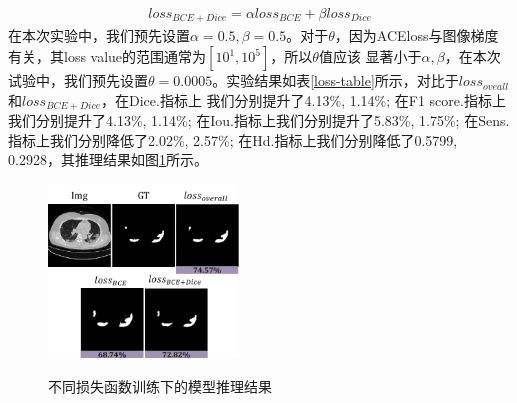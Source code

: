 \documentclass{ieeeaccess}
\begin{document}
    \begin{align}
      loss_{BCE+Dice} = \alpha loss_{BCE} + \beta loss_{Dice}
    \end{align}
    在本次实验中，我们预先设置\(\alpha=0.5, \beta=0.5\)。对于\(\theta\)，因为ACEloss与图像梯度有关，其loss value的范围通常为\([10^1, 10^5]\)，所以\(\theta\)值应该
    显著小于\(\alpha, \beta\)，在本次试验中，我们预先设置\(\theta=0.0005\)。实验结果如表\ref{loss-table}所示，对比于\(loss_{oveall}\)和\(loss_{BCE+Dice}\)，在Dice.指标上
    我们分别提升了4.13\%, 1.14\%; 在F1 score.指标上我们分别提升了4.13\%, 1.14\%; 在Iou.指标上我们分别提升了5.83\%, 1.75\%; 在Sens.指标上我们分别降低了2.02\%, 2.57\%;
    在Hd.指标上我们分别降低了0.5799, 0.2928，其推理结果如图\ref{fig:ablation_loss}所示。
   
    
     
    \begin{figure}[htbp]
      \begin{center}
      \includegraphics[width=0.45\textwidth]{figure/abliation_loss_img.pdf}
      \vspace{-2mm}
      \caption{不同损失函数训练下的模型推理结果} 
      \vspace{-2mm}
      \label{fig:ablation_loss}
      \end{center}
      \vspace{-0.35cm}
    \end{figure}
  
  
  
  
\end{document}
